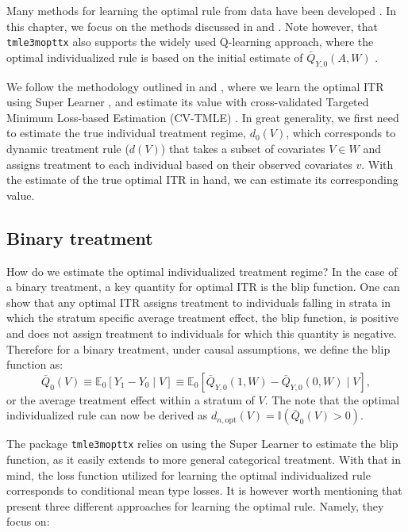 \documentclass[12pt, krantz2,]{krantz}
\newcommand{\passthrough}[1]{#1}
\theoremstyle{definition}
\theoremstyle{definition}
\theoremstyle{definition}
\newcommand{\E}{\mathbb{E}}
\newcommand{\1}{\mathbbm{1}}
\begin{document}
Many methods for learning the optimal rule from data have been developed
\citep{murphy2003, robins2004, laber2012, kosorok2012, moodie2013}. In this
chapter, we focus on the methods discussed in \citet{luedtke2016super} and
\citet{vanderLaanLuedtke15}. Note however, that \passthrough{\lstinline!tmle3mopttx!} also supports the widely
used Q-learning approach, where the optimal individualized rule is based on the
initial estimate of \(\bar{Q}_{Y,0}(A,W)\) \citep{Sutton1998}.

We follow the methodology outlined in \citet{luedtke2016super} and
\citet{vanderLaanLuedtke15}, where we learn the optimal ITR using Super Learner
\citep{vdl2007super}, and estimate its value with cross-validated Targeted Minimum
Loss-based Estimation (CV-TMLE) \citep{cvtmle2010}. In great generality, we first
need to estimate the true individual treatment regime, \(d_0(V)\), which
corresponds to dynamic treatment rule (\(d(V)\)) that takes a subset of covariates
\(V \in W\) and assigns treatment to each individual based on their observed
covariates \(v\). With the estimate of the true optimal ITR in hand, we can
estimate its corresponding value.

\hypertarget{binary-treatment}{%
\subsection{Binary treatment}\label{binary-treatment}}

How do we estimate the optimal individualized treatment regime? In the case of a
binary treatment, a key quantity for optimal ITR is the blip function. One can
show that any optimal ITR assigns treatment to individuals falling in strata in
which the stratum specific average treatment effect, the blip function, is
positive and does not assign treatment to individuals for which this quantity is
negative. Therefore for a binary treatment, under causal assumptions, we define
the blip function as:
\[\bar{Q}_0(V) \equiv \E_0[Y_1-Y_0 \mid V] \equiv \E_0[\bar{Q}_{Y,0}(1,W) -
\bar{Q}_{Y,0}(0,W) \mid V],\]
or the average treatment effect within a stratum of \(V\). The note that the
optimal individualized rule can now be derived as \(d_{n,\text{opt}}(V) = \mathbb{I}(\bar{Q}_{0}(V) > 0)\).

The package \passthrough{\lstinline!tmle3mopttx!} relies on using the Super Learner to estimate the blip
function, as it easily extends to more general categorical treatment. With that
in mind, the loss function utilized for learning the optimal individualized rule
corresponds to conditional mean type losses. It is however worth mentioning that
\citet{luedtke2016super} present three different approaches for learning the optimal
rule. Namely, they focus on:
\end{document}
